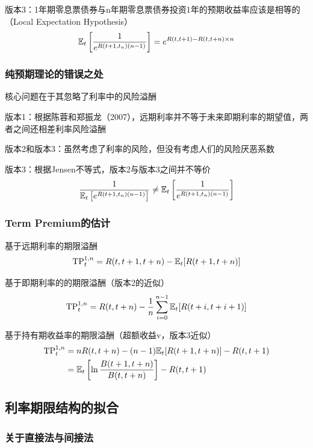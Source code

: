 \documentclass[11pt]{article}
\begin{document}
版本3：1年期零息票债券与n年期零息票债券投资1年的预期收益率应该是相等的（Local Expectation Hypothesis）
\begin{equation*}
	\mathbb{E}_t \left[\frac{1}{e^{R(t+1,t_n)(n-1)}}\right] = e^{R(t,t+1)-R(t,t+n)\times n}
\end{equation*}

\subsubsection{纯预期理论的错误之处}

核心问题在于其忽略了利率中的风险溢酬

版本1：根据陈蓉和郑振龙（2007），远期利率并不等于未来即期利率的期望值，两者之间还相差利率风险溢酬

版本2和版本3：虽然考虑了利率的风险，但没有考虑人们的风险厌恶系数

版本3：根据Jensen不等式，版本2与版本3之间并不等价
\begin{equation*}
	\frac{1}{\mathbb{E}_t\left[e^{R(t+1,t_n)(n-1)}\right]}
	\neq \mathbb{E}_t \left[\frac{1}{e^{R(t+1,t_n)(n-1)}}\right]
\end{equation*}

\subsubsection{Term Premium的估计}

基于远期利率的期限溢酬
\begin{equation*}
	\text{TP}_t^{1,n} = R(t,t+1,t+n) - \mathbb{E}_t[R(t+1,t+n)]
\end{equation*}

基于即期利率的的期限溢酬（版本2的近似）
\begin{equation*}
	\text{TP}_t^{1,n} = R(t,t+n) - \frac{1}{n} \sum^{n-1}_{i=0} \mathbb{E}_t[R(t+i,t+i+1)]
\end{equation*}

基于持有期收益率的期限溢酬（超额收益v，版本3近似）
\begin{align*}
	\text{TP}_t^{1,n} &= n R(t,t+n) - (n-1)\mathbb{E}_t[R(t+1,t+n)] - R(t,t+1) \\
	&= \mathbb{E}_t \left[\ln \frac{B(t+1,t+n)}{B(t,t+n)} \right] - R(t,t+1)
\end{align*}

\subsection{利率期限结构的拟合}

\subsubsection{关于直接法与间接法}
\end{document}
